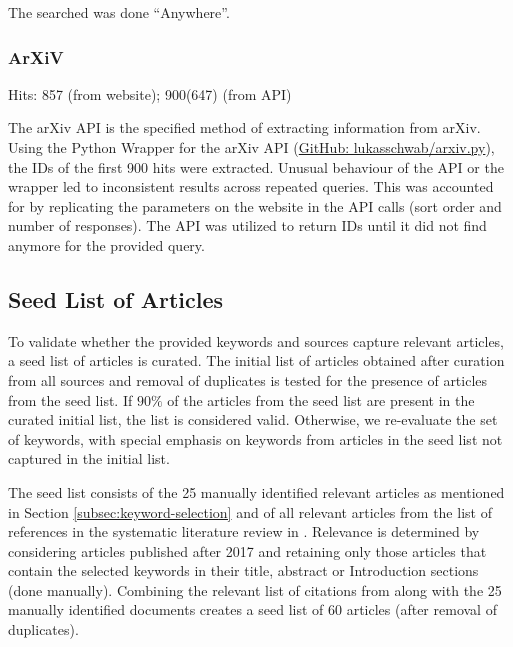 \documentclass[a4paper,colorinlistoftodos]{article}
\begin{document}
The searched was done ``Anywhere''.

\subsubsection{ArXiV}
\label{subsubsec:arxiv}

Hits: 857 (from website); 900(647) (from API)

The arXiv API is the specified method of extracting information from
arXiv. Using the Python Wrapper for the arXiv API
(\href{https://github.com/lukasschwab/arxiv.py}{GitHub:
  lukasschwab/arxiv.py}), the IDs of the first 900 hits were
extracted. Unusual behaviour of the API or the wrapper led to inconsistent
results across repeated queries. This was accounted for by replicating the
parameters on the website in the API calls (sort order and number of
responses). The API was utilized to return IDs until it did not find anymore
for the provided query.

\subsection{Seed List of Articles}
\label{subsec:seed-list}

To validate whether the provided keywords and sources capture relevant
articles, a seed list of articles is curated. The initial list of articles
obtained after curation from all sources and removal of duplicates is tested
for the presence of articles from the seed list. If $90\%$ of the articles
from the seed list are present in the curated initial list, the list is
considered valid. Otherwise, we re-evaluate the set of keywords, with special
emphasis on keywords from articles in the seed list not captured in the
initial list.

The seed list consists of the 25 manually identified relevant articles as mentioned in
Section \ref{subsec:keyword-selection} and of all relevant articles from the
list of references in the systematic literature review in
\citet{li2025LargeLanguageModels}. Relevance is determined by considering
articles published after 2017 and retaining only those articles that
contain the selected keywords in their title, abstract or Introduction
sections (done manually). Combining the relevant list of citations from
\citet{li2025LargeLanguageModels} along with the 25 manually identified
documents creates a seed list of 60 articles (after removal of duplicates).




\end{document}

